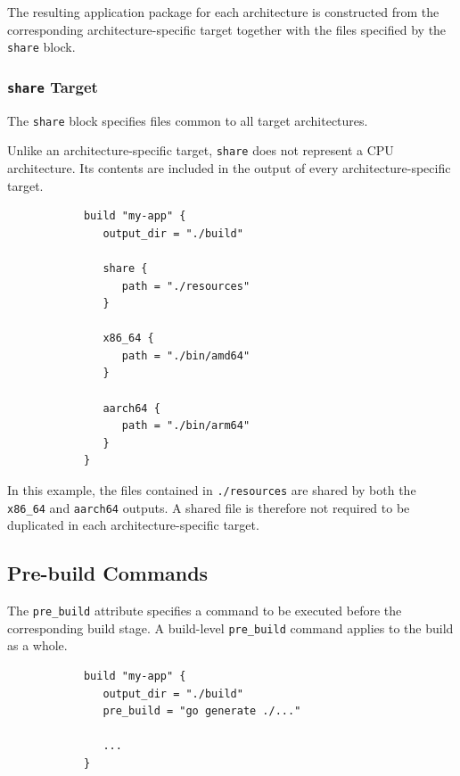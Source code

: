 \documentclass[11pt,a4paper]{article}
\begin{document}
    The resulting application package for each architecture is constructed from the corresponding architecture-specific target together with the files specified by the \texttt{share} block.

    \subsubsection{\texttt{share} Target}

    The \texttt{share} block specifies files common to all target architectures.

    Unlike an architecture-specific target, \texttt{share} does not represent a CPU architecture.
    Its contents are included in the output of every architecture-specific target.

    \begin{center}
        \begin{verbatim}
            build "my-app" {
               output_dir = "./build"

               share {
                  path = "./resources"
               }

               x86_64 {
                  path = "./bin/amd64"
               }

               aarch64 {
                  path = "./bin/arm64"
               }
            }
        \end{verbatim}
    \end{center}

    In this example, the files contained in \texttt{./resources} are shared by both the \texttt{x86\_64} and \texttt{aarch64} outputs.
    A shared file is therefore not required to be duplicated in each architecture-specific target.

    \subsection{Pre-build Commands}\label{subsec:pre-build-commands}

    The \texttt{pre\_build} attribute specifies a command to be executed before the corresponding build stage.
    A build-level \texttt{pre\_build} command applies to the build as a whole.

    \begin{center}
        \begin{verbatim}
            build "my-app" {
               output_dir = "./build"
               pre_build = "go generate ./..."

               ...
            }
        \end{verbatim}
    \end{center}
\end{document}
